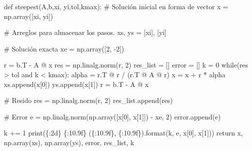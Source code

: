 \documentclass[
  letterpaper,
  DIV=11,
  numbers=noendperiod]{scrreprt}
\newenvironment{Shaded}{\begin{snugshade}}{\end{snugshade}}
\newcommand{\BuiltInTok}[1]{\textcolor[rgb]{0.00,0.23,0.31}{#1}}
\newcommand{\CommentTok}[1]{\textcolor[rgb]{0.37,0.37,0.37}{#1}}
\newcommand{\ControlFlowTok}[1]{\textcolor[rgb]{0.00,0.23,0.31}{#1}}
\newcommand{\DecValTok}[1]{\textcolor[rgb]{0.68,0.00,0.00}{#1}}
\newcommand{\KeywordTok}[1]{\textcolor[rgb]{0.00,0.23,0.31}{#1}}
\newcommand{\NormalTok}[1]{\textcolor[rgb]{0.00,0.23,0.31}{#1}}
\newcommand{\OperatorTok}[1]{\textcolor[rgb]{0.37,0.37,0.37}{#1}}
\newcommand{\SpecialCharTok}[1]{\textcolor[rgb]{0.37,0.37,0.37}{#1}}
\newcommand{\StringTok}[1]{\textcolor[rgb]{0.13,0.47,0.30}{#1}}
\begin{document}
\begin{Shaded}
\begin{Highlighting}[]
\KeywordTok{def}\NormalTok{ steepest(A,b,xi, yi,tol,kmax):}
    \CommentTok{\# Solución inicial en forma de vector}
\NormalTok{    x }\OperatorTok{=}\NormalTok{ np.array([xi, yi]) }
    
    \CommentTok{\# Arreglos para almacenar los pasos.}
\NormalTok{    xs, ys }\OperatorTok{=}\NormalTok{ [xi], [yi]}
    
    \CommentTok{\# Solución exacta}
\NormalTok{    xe }\OperatorTok{=}\NormalTok{ np.array([}\DecValTok{2}\NormalTok{, }\OperatorTok{{-}}\DecValTok{2}\NormalTok{]) }
                  
\NormalTok{    r }\OperatorTok{=}\NormalTok{ b.T }\OperatorTok{{-}}\NormalTok{ A }\OperatorTok{@}\NormalTok{ x}
\NormalTok{    res }\OperatorTok{=}\NormalTok{ np.linalg.norm(r, }\DecValTok{2}\NormalTok{)}
\NormalTok{    res\_list }\OperatorTok{=}\NormalTok{ []}
\NormalTok{    error }\OperatorTok{=}\NormalTok{ []}
\NormalTok{    k }\OperatorTok{=} \DecValTok{0}
    \ControlFlowTok{while}\NormalTok{(res }\OperatorTok{\textgreater{}}\NormalTok{ tol }\KeywordTok{and}\NormalTok{ k }\OperatorTok{\textless{}}\NormalTok{ kmax):}
\NormalTok{        alpha }\OperatorTok{=}\NormalTok{ r.T }\OperatorTok{@}\NormalTok{ r }\OperatorTok{/}\NormalTok{ (r.T }\OperatorTok{@}\NormalTok{ A }\OperatorTok{@}\NormalTok{ r)}
\NormalTok{        x }\OperatorTok{=}\NormalTok{ x }\OperatorTok{+}\NormalTok{ r }\OperatorTok{*}\NormalTok{ alpha}
\NormalTok{        xs.append(x[}\DecValTok{0}\NormalTok{])}
\NormalTok{        ys.append(x[}\DecValTok{1}\NormalTok{])}
\NormalTok{        r }\OperatorTok{=}\NormalTok{ b.T }\OperatorTok{{-}}\NormalTok{ A }\OperatorTok{@}\NormalTok{ x}
        
        \CommentTok{\# Resido}
\NormalTok{        res }\OperatorTok{=}\NormalTok{ np.linalg.norm(r, }\DecValTok{2}\NormalTok{)}
\NormalTok{        res\_list.append(res)}
        
        \CommentTok{\# Error}
\NormalTok{        e }\OperatorTok{=}\NormalTok{ np.linalg.norm(np.array([x[}\DecValTok{0}\NormalTok{], x[}\DecValTok{1}\NormalTok{]]) }\OperatorTok{{-}}\NormalTok{ xe, }\DecValTok{2}\NormalTok{)}
\NormalTok{        error.append(e)}
        
\NormalTok{        k }\OperatorTok{+=} \DecValTok{1}
        \BuiltInTok{print}\NormalTok{(}\StringTok{\textquotesingle{}}\SpecialCharTok{\{:2d\}}\StringTok{ }\SpecialCharTok{\{:10.9f\}}\StringTok{ (}\SpecialCharTok{\{:10.9f\}}\StringTok{, }\SpecialCharTok{\{:10.9f\}}\StringTok{)\textquotesingle{}}\NormalTok{.}\BuiltInTok{format}\NormalTok{(k, e, x[}\DecValTok{0}\NormalTok{], x[}\DecValTok{1}\NormalTok{]))}
    \ControlFlowTok{return}\NormalTok{ x, np.array(xs), np.array(ys), error, res\_list, k }
\end{Highlighting}
\end{Shaded}
\end{document}
